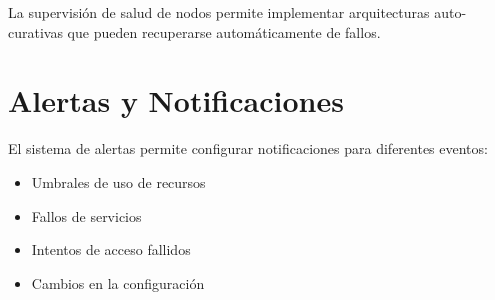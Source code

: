 La supervisión de salud de nodos permite implementar arquitecturas auto-curativas que pueden recuperarse automáticamente de fallos.

\section{Alertas y Notificaciones}

El sistema de alertas permite configurar notificaciones para diferentes eventos:

\begin{itemize}
    \item Umbrales de uso de recursos
    \item Fallos de servicios
    \item Intentos de acceso fallidos
    \item Cambios en la configuración
\end{itemize}

\clearpage
